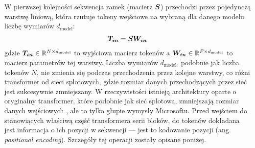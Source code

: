 W pierwszej kolejności sekwencja ramek (macierz $\boldsymbol{S}$) przechodzi przez pojedynczą warstwę liniową, która rzutuje tokeny wejściowe na wybraną dla danego modelu liczbę wymiarów $d_{\mathrm{model}}$:
\begin{equation}
    \boldsymbol{T_{in}} = \boldsymbol{S} \boldsymbol{W_{in}}
\end{equation}
gdzie $\boldsymbol{T_{in}} \in \mathbb{R}^{N \times d_{\mathrm{model}}}$ to wyjściowa macierz tokenów a $\boldsymbol{W_{in}} \in \mathbb{R}^{F \times d_{\mathrm{model}}}$ to macierz parametrów tej warstwy. Liczba wymiarów $d_{\mathrm{model}}$, podobnie jak liczba tokenów $N$, nie zmienia się podczas przechodzenia przez kolejne warstwy, co różni transformer od sieci splotowych, gdzie rozmiar danych przechodzących przez sieć jest sukcesywnie zmniejszany. W rzeczywistości istnieją architektury oparte o oryginalny transformer, które podobnie jak sieć splotowa, zmniejszają rozmiar danych wejściowych \cite{liu_swin_2021}, ale to tylko głupie wymysły Microsoftu. Przed wejściem do stanowiących właściwą część transformera serii bloków, do tokenów dokładana jest informacja o ich pozycji w sekwencji --- jest to kodowanie pozycji (ang. \emph{positional encoding}). Szczegóły tej operacji zostały opisane poniżej.

